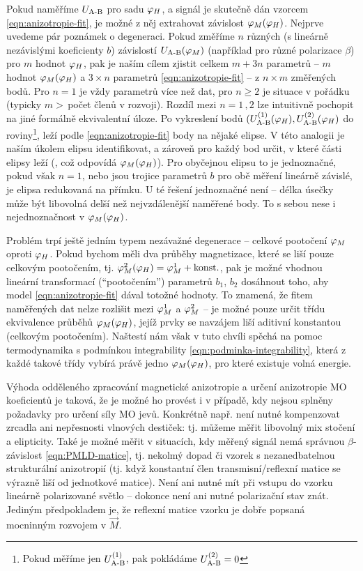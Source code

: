 Pokud naměříme $U_\textrm{A-B}$ pro sadu $\varphi_H$, a signál je skutečně dán vzorcem \eqref{eqn:anizotropie-fit}, je možné z něj extrahovat závislost $\varphi_M(\varphi_H)$.
Nejprve uvedeme pár poznámek o degeneraci.
Pokud změříme $n$ různých (s lineárně nezávislými koeficienty $b$) závislostí $U_\textrm{A-B}(\varphi_M)$ (například pro různé polarizace $\beta$) pro $m$ hodnot $\varphi_H$, pak je naším cílem zjistit celkem $m+3n$ parametrů -- $m$ hodnot $\varphi_M(\varphi_H)$ a $3\times n$ parametrů \eqref{eqn:anizotropie-fit} -- z $n\times m$ změřených bodů.
Pro $n=1$ je vždy parametrů více než dat, pro $n\geq 2$ je situace v pořádku (typicky $m>\,$počet členů v rozvoji).
Rozdíl mezi $n=1\,,2$ lze intuitivně pochopit na jiné formálně ekvivalentní úloze.
Po vykreslení bodů $(U_\textrm{A-B}^{(1)}(\varphi_H), U_\textrm{A-B}^{(2)}(\varphi_H)$ do roviny\footnote{Pokud měříme jen $U_\textrm{A-B}^{(1)}$, pak pokládáme $U_\textrm{A-B}^{(2)}=0$}, leží podle \eqref{eqn:anizotropie-fit} body na nějaké elipse.
V této analogii je naším úkolem elipsu identifikovat, a zároveň pro každý bod určit, v které části elipsy leží (, což odpovídá $\varphi_M(\varphi_H)$).
Pro obyčejnou elipsu to je jednoznačné, pokud však $n=1$, nebo jsou trojice parametrů $b$ pro obě měření lineárně závislé, je elipsa redukovaná na přímku.
U té řešení jednoznačné není -- délka úsečky může být libovolná delší než nejvzdálenější naměřené body.
To s sebou nese i nejednoznačnost v $\varphi_M(\varphi_H)$.

Problém trpí ještě jedním typem nezávažné degenerace -- celkové pootočení $\varphi_M$ oproti $\varphi_H$.
Pokud bychom měli dva průběhy magnetizace, které se liší pouze celkovým pootočením, tj. $\varphi_M^2(\varphi_H)=\varphi_M^1 + \textrm{konst.}$,
pak je možné vhodnou lineární transformací (``pootočením'') parametrů $b_1$, $b_2$ dosáhnout toho, aby model \eqref{eqn:anizotropie-fit} dával totožné hodnoty.
To znamená, že fitem naměřených dat nelze rozlišit mezi $\varphi_M^1$ a $\varphi_M^2$ -- je možné pouze určit třídu ekvivalence průběhů $\varphi_M(\varphi_H)$, jejíž prvky se navzájem liší aditivní konstantou (celkovým pootočením).
Naštestí nám však v tuto chvíli spěchá na pomoc termodynamika s podmínkou integrability \eqref{eqn:podminka-integrability}, která z každé takové třídy vybírá právě jedno $\varphi_M(\varphi_H)$, pro které existuje volná energie.

Výhoda odděleného zpracování magnetické anizotropie a určení anizotropie MO koeficientů je taková, že je možné ho provést i v případě, kdy nejsou splněny požadavky pro určení síly MO jevů.
Konkrétně např. není nutné kompenzovat zrcadla ani nepřesnosti vlnových destiček: tj. můžeme měřit libovolný mix stočení a elipticity.
Také je možné měřit v situacích, kdy měřený signál nemá správnou $\beta$-závislost \eqref{eqn:PMLD-matice}, tj. nekolmý dopad či vzorek s nezanedbatelnou strukturální anizotropií (tj. když konstantní člen transmisní/reflexní matice se výrazně liší od jednotkové matice).
Není ani nutné mít při vstupu do vzorku lineárně polarizované světlo -- dokonce není ani nutné polarizační stav znát.
Jediným předpokladem je, že reflexní matice vzorku je dobře popsaná mocninným rozvojem v $\vec{M}$.

